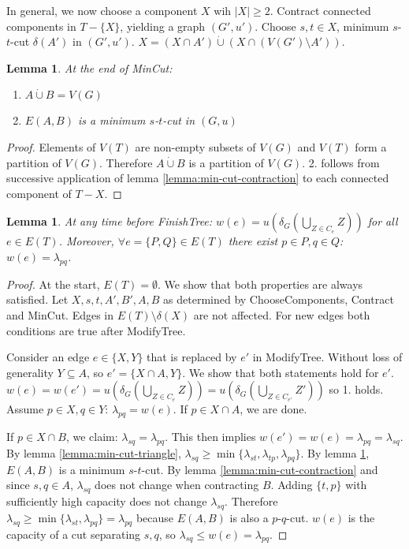 \documentclass[11pt, a4paper]{article}
\newcommand{\abs}[1]{\left\lvert#1\right\rvert}
\newcommand{\set}[1]{\{#1\}}
\newtheorem{lemma}[theorem]{Lemma}
\theoremstyle{remark}
\theoremstyle{definition}
\begin{document}
In general, we now choose a component $X$ wih $\abs{X}\geq2$.
Contract connected components in $T-\set{X}$, yielding a graph
$(G',u')$. Choose $s,t\in X$, minimum $s$-$t$-cut $\delta(A')$ in
$(G',u')$. $X= (X\cap A')\dot\cup (X\cap (V(G')\setminus A'))$.

\begin{lemma}\label{lemma:min-cut-algorithm}
	At the end of MinCut:
	\begin{enumerate}
		\item $A\dot\cup B=V(G)$
		\item $E(A,B)$ is a minimum $s$-$t$-cut in $(G,u)$
	\end{enumerate}
\end{lemma}
\begin{proof}
	Elements of $V(T)$ are non-empty subsets of $V(G)$ and $V(T)$ form a
	partition of $V(G)$. Therefore $A\dot\cup B$ is a partition of $V(G)$.
	2. follows from successive application of lemma \ref{lemma:min-cut-contraction}
	to each connected component of $T-X$.
\end{proof}

\begin{lemma}\label{lemma:gomory-hu-alg-correct}
	At any time before FinishTree: $w(e)=u(\delta_G(\bigcup_{Z\in C_e}Z))$
	for all $e\in E(T)$. Moreover, $\forall e=\set{P,Q}\in E(T)$ there exist
	$p\in P, q\in Q$: $w(e)=\lambda_{pq}$.
\end{lemma}
\begin{proof}
	At the start, $E(T)=\emptyset$. We show that both properties are always
	satisfied. Let $X,s,t,A',B',A,B$ as determined by ChooseComponents,
	Contract and MinCut. Edges in $E(T)\setminus\delta(X)$ are not affected.
	For new edges both conditions are true after ModifyTree.

	Consider an edge $e\in \set{X,Y}$ that is replaced by $e'$ in
	ModifyTree. Without loss of generality $Y\subseteq A$, so
	$e'=\set{X\cap A,Y}$. We show that both statements hold for $e'$.
	$w(e)=w(e')= u(\delta_G(\bigcup_{Z\in
			C_e}Z))=u(\delta_G(\bigcup_{Z\in C_{e'}}Z'))$ so 1. holds. Assume
	$p\in X,q\in Y$: $\lambda_{pq}=w(e)$. If $p\in X\cap A$, we are done.

	If $p\in X\cap B$, we claim: $\lambda_{sq}=\lambda_{pq}$. This then
	implies $w(e')=w(e)=\lambda_{pq}=\lambda_{sq}$. By lemma
	\ref{lemma:min-cut-triangle},
	$\lambda_{sq}\geq\min\set{\lambda_{st},\lambda_{tp},\lambda_{pq}}$.
	By lemma \ref{lemma:min-cut-algorithm}, $E(A,B)$ is a minimum
	$s$-$t$-cut. By lemma \ref{lemma:min-cut-contraction} and since
	$s,q\in A$, $\lambda_{sq}$ does not change when contracting $B$.
	Adding $\set{t,p}$ with sufficiently high capacity does not change
	$\lambda_{sq}$. Therefore $\lambda_{sq}\geq
		\min\set{\lambda_{st},\lambda_{pq}}=\lambda_{pq}$ because $E(A,B)$ is
	also a $p$-$q$-cut. $w(e)$ is the capacity of a cut separating $s,q$,
	so $\lambda_{sq}\leq w(e)=\lambda_{pq}$.
\end{proof}
\end{document}
